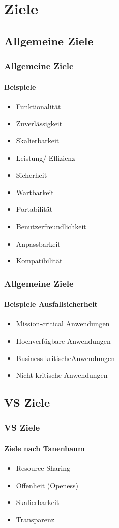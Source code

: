 \section{Ziele}
\subsection{Allgemeine Ziele}
\begin{frame}
  \frametitle{Allgemeine Ziele}
  \framesubtitle{Beispiele}
  \begin{itemize}
    \item Funktionalität
    \item Zuverlässigkeit
    \item Skalierbarkeit
    \item Leistung/ Effizienz 
    \item Sicherheit
    \item Wartbarkeit
    \item Portabilität
    \item Benutzerfreundlichkeit
    \item Anpassbarkeit
    \item Kompatibilität
  \end{itemize}
\end{frame}

\begin{frame}
  \frametitle{Allgemeine Ziele}
  \framesubtitle{Beispiele Ausfallsicherheit}
   \begin{itemize}
    \item Mission-critical Anwendungen
    \item Hochverfügbare Anwendungen
    \item Business-kritischeAnwendungen
    \item Nicht-kritische Anwendungen
  \end{itemize}
\end{frame}

\subsection{VS Ziele}
\begin{frame}
  \frametitle{VS Ziele}
  \framesubtitle{Ziele nach Tanenbaum}
   \begin{itemize}
    \item Resource Sharing
    \item Offenheit (Openess)
    \item Skalierbarkeit
    \item Transparenz
  \end{itemize}
\end{frame}